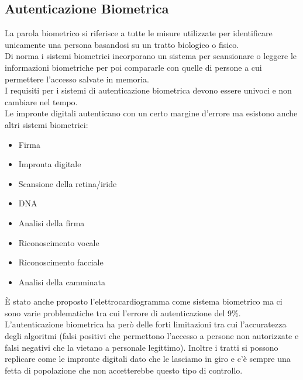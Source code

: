 \subsection{Autenticazione Biometrica}
La parola biometrico si riferisce a tutte le misure utilizzate per identificare unicamente una persona basandosi su un tratto biologico o fisico.\\
Di norma i sistemi biometrici incorporano un sistema per scansionare o leggere le informazioni biometriche per poi compararle con quelle di persone a cui permettere l'accesso salvate in memoria.\\
I requisiti per i sistemi di autenticazione biometrica devono essere univoci e non cambiare nel tempo.\\
Le impronte digitali autenticano con un certo margine d'errore ma esistono anche altri sistemi biometrici:
\begin{itemize}[noitemsep]
    \item Firma
    \item Impronta digitale
    \item Scansione della retina/iride
    \item DNA
    \item Analisi della firma
    \item Riconoscimento vocale
    \item Riconoscimento facciale
    \item Analisi della camminata
\end{itemize}
È stato anche proposto l'elettrocardiogramma come sistema biometrico ma ci sono varie problematiche tra cui l'errore di autenticazione del 9\%.
L'autenticazione biometrica ha però delle forti limitazioni tra cui l'accuratezza degli algoritmi (falsi positivi che permettono l'accesso a persone non autorizzate e falsi negativi che la vietano a personale legittimo).
Inoltre i tratti si possono replicare come le impronte digitali dato che le lasciamo in giro e c'è sempre una fetta di popolazione che non accetterebbe questo tipo di controllo.


